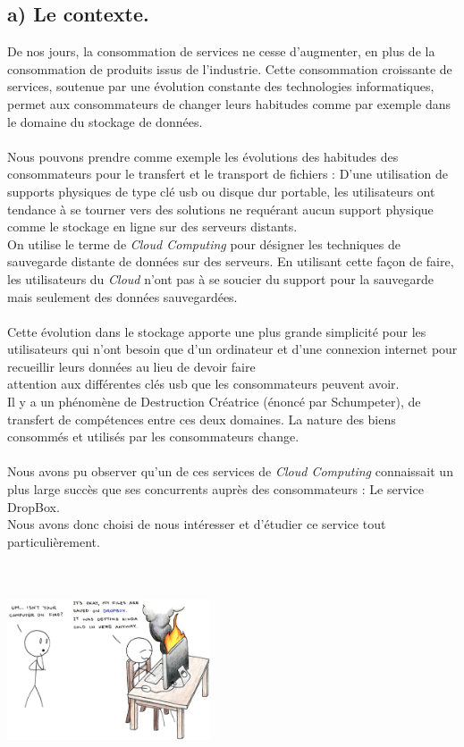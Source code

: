 \documentclass[a4paper, 10pt]{article}
\begin{document}
\subsection*{a) Le contexte.}
De nos jours, la consommation de services ne cesse d'augmenter, en plus de la consommation de produits issus de l'industrie.
Cette consommation croissante de services, soutenue par une évolution constante des technologies informatiques, permet aux consommateurs
de changer leurs habitudes comme par exemple dans le domaine du stockage de données.\\ \\
Nous pouvons prendre comme exemple les évolutions des habitudes des consommateurs pour le transfert et le transport de fichiers :
D'une utilisation de supports physiques de type clé usb ou disque dur portable, les utilisateurs ont tendance à se tourner vers des solutions
ne requérant aucun support physique comme le stockage en ligne sur des serveurs distants.\\
On utilise le terme de \textit{Cloud Computing} pour désigner les techniques de sauvegarde distante de données sur des serveurs.
En utilisant cette façon de faire, les utilisateurs du \textit{Cloud} n'ont pas à se soucier du support pour la sauvegarde mais
seulement des donn\'ees sauvegardées.\\ \\
Cette évolution dans le stockage apporte une plus grande simplicité pour les utilisateurs
qui n'ont besoin que d'un ordinateur et d'une connexion internet pour recueillir leurs données
au lieu de devoir faire\\attention aux différentes clés usb que les consommateurs peuvent avoir.\\
Il y a un phénomène de Destruction Créatrice (énoncé par Schumpeter), de transfert de compétences entre ces deux domaines.
La nature des biens consommés et utilisés par les consommateurs change.\\ \\
Nous avons pu observer qu'un de ces services de \textit{Cloud Computing} connaissait un plus large succès
que ses concurrents auprès des consommateurs : Le service DropBox.\\
Nous avons donc choisi de nous intéresser et d'étudier ce service tout particulièrement.\\ \\
\includegraphics[height = 6cm, width = 6cm]{jpg/db1.jpg}
\newpage
\end{document}
